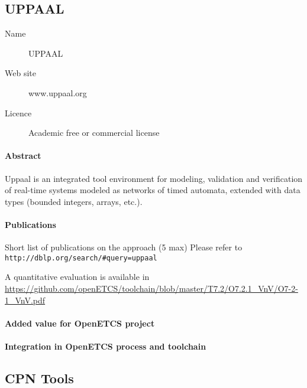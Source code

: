 \subsection{UPPAAL}
\label{sec: UPPAALL}

\begin{description}
\item[Name] UPPAAL
\item[Web site] www.uppaal.org
\item[Licence] Academic free or commercial license
\end{description}

\paragraph{Abstract} Uppaal is an integrated tool environment for modeling, validation and verification of real-time systems modeled as networks of timed automata, extended with data types (bounded integers, arrays, etc.).

\paragraph{Publications} Short list of publications on the approach (5 max)
Please refer to \verb|http://dblp.org/search/#query=uppaal|



A quantitative evaluation is available in \url{https://github.com/openETCS/toolchain/blob/master/T7.2/O7.2.1_VnV/O7-2-1_VnV.pdf}


\paragraph{Added value for OpenETCS project}

\begin{comment}
To complete: Stefan Rieger  ?
\end{comment}


\paragraph{Integration in OpenETCS process and toolchain}

\begin{comment}
To complete: Stefan Rieger  ?
\end{comment}


\subsection{CPN Tools}
\label{sec:CPN-Tools}

